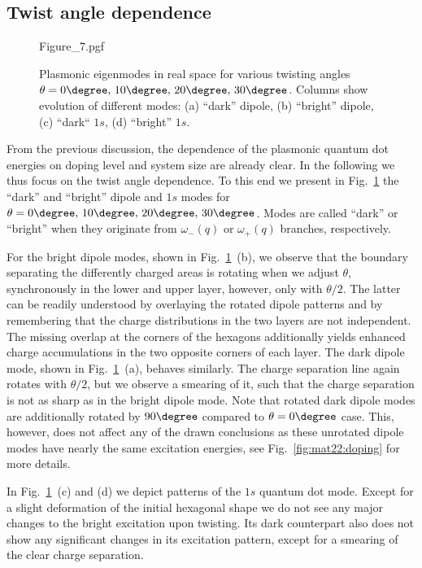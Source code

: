 \subsection{Twist angle dependence}

\begin{figure}
    \centering
    {Figure_7.pgf}
    \caption{Plasmonic eigenmodes in real space for various twisting angles $\theta=0\degree,\,10\degree,\,20\degree,\,30\degree$. Columns show evolution of different modes: (a) ``dark'' dipole, (b) ``bright'' dipole, (c) ``dark`` $1s$, (d) ``bright'' $1s$.}
    \label{fig:mat22:modesTheta}
\end{figure}

From the previous discussion, the dependence of the plasmonic quantum dot energies on doping level and system size are already clear. In the following we thus focus on the twist angle dependence. To this end we present in Fig.~\ref{fig:mat22:modesTheta} the ``dark'' and ``bright'' dipole and $1s$ modes for $\theta=0\degree, \,10\degree, \,20\degree, \,30\degree$. Modes are called ``dark'' or ``bright'' when they originate from $\omega_-(q)$ or $\omega_+(q)$ branches, respectively.

For the bright dipole modes, shown in Fig.~\ref{fig:mat22:modesTheta}~(b), we observe that the boundary separating the differently charged areas is rotating when we adjust $\theta$, synchronously in the lower and upper layer, however, only with $\theta/2$. The latter can be readily understood by overlaying the rotated dipole patterns and by remembering that the charge distributions in the two layers are not independent. The missing overlap at the corners of the hexagons additionally yields enhanced charge accumulations in the two opposite corners of each layer. The dark dipole mode, shown in Fig.~\ref{fig:mat22:modesTheta}~(a), behaves similarly. The charge separation line again rotates with $\theta/2$, but we observe a smearing of it, such that the charge separation is not as sharp as in the bright dipole mode. Note that rotated dark dipole modes are additionally rotated by $90\degree$ compared to $\theta=0\degree$ case. This, however, does not affect any of the drawn conclusions as these unrotated dipole modes have nearly the same excitation energies, see Fig.~\ref{fig:mat22:doping} for more details.

In Fig.~\ref{fig:mat22:modesTheta}~(c) and (d) we depict patterns of the $1s$ quantum dot mode. Except for a slight deformation of the initial hexagonal shape we do not see any major changes to the bright excitation upon twisting. Its dark counterpart also does not show any significant changes in its excitation pattern, except for a smearing of the clear charge separation.

